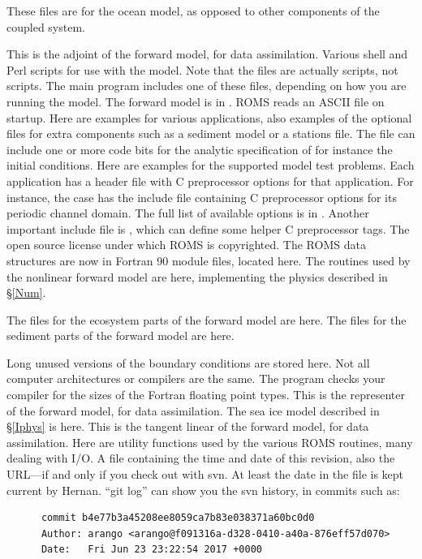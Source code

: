 \begin{klist}
  These files are for the ocean model, as opposed to other components of
  the coupled system.
\begin{klist}
   This is the adjoint of the forward model, for data
    assimilation.
   Various shell and Perl scripts for use with the model.
    Note that the  files are actually  scripts, not
     scripts.
   The main program includes one of these files,
    depending on how you are running the model. The forward model is in
    .
   ROMS reads an ASCII file on startup. Here are
    examples for various applications, also examples of the optional
    files for extra components such as a sediment model or a stations
    file.
   The file  can include one
    or more code bits for the analytic specification of for instance the
    initial conditions. Here are examples for the supported model test
    problems.
   Each application has a header file with C
    preprocessor options for that application. For instance, the
     case has the include file 
    containing C preprocessor options for its periodic channel domain.
    The full list of available options is in .
    Another important include file is , which can
    define some helper C preprocessor tags.
   The open source license under which ROMS
    is copyrighted.
   The ROMS data structures are now in Fortran 90
    module files, located here.
   The routines used by the nonlinear forward model
    are here, implementing the physics described in \S\ref{Num}.
  \begin{klist}
     The files for the ecosystem parts of the forward
    model are here.
     The files for the sediment parts of the forward
    model are here.
  \end{klist}
   Long unused versions of the boundary conditions
    are stored here.
   Not all computer architectures or compilers are the same.
    The  program checks your compiler for the sizes of the
    Fortran floating point types.
   This is the representer of the forward model, for
    data assimilation.
   The sea ice model described in \S\ref{Iphys} is here.
   This is the tangent linear of the forward model, for data
    assimilation.
   Here are utility functions used by the various
    ROMS routines, many dealing with I/O.
   A file containing the time and date of this
     revision, also the  URL---if and only if you
    check out with svn. At least the date in the file is kept current
    by Hernan. ``git log'' can show you the svn history, in commits such as:
    \begin{verbatim}
      commit b4e77b3a45208ee8059ca7b83e038371a60bc0d0
      Author: arango <arango@f091316a-d328-0410-a40a-876eff57d070>
      Date:   Fri Jun 23 23:22:54 2017 +0000


\end{verbatim}
\end{klist}
\end{klist}
